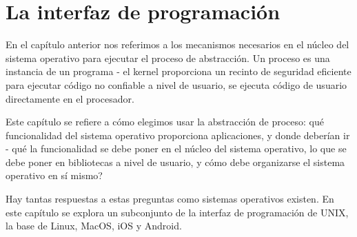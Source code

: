 \documentclass[10pt]{book}
\begin{document}
\chapter{La interfaz de programación}
En el capítulo anterior nos referimos a los mecanismos necesarios en el núcleo del sistema operativo para ejecutar el proceso de abstracción. Un proceso es una instancia de un programa - el kernel proporciona un recinto de seguridad eficiente para ejecutar código no confiable a nivel de usuario, se ejecuta código de usuario directamente en el procesador.

Este capítulo se refiere a cómo elegimos usar la abstracción de proceso: qué funcionalidad del sistema operativo proporciona aplicaciones, y donde deberían ir - qué la funcionalidad se debe poner en el núcleo del sistema operativo, lo que se debe poner en bibliotecas a nivel de usuario, y cómo debe organizarse el sistema operativo en sí mismo?

Hay tantas respuestas a estas preguntas como sistemas operativos existen. En este capítulo se explora un subconjunto de la interfaz de programación de UNIX, la base de Linux, MacOS, iOS y Android.
\end{document}
